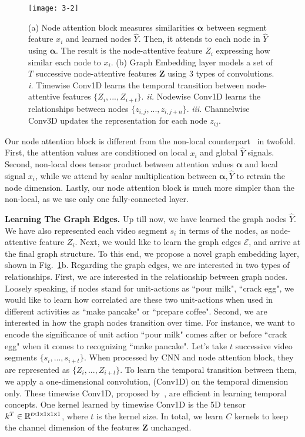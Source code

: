 \documentclass[10pt,twocolumn,letterpaper]{article}
\newcommand{\partitle}[1]{\noindent\textbf{#1}}
\newcommand{\ptspace}{\vspace*{5pt}}
\begin{document}
\begin{figure}[!ht]
\begin{center}
\texttt{[image: 3-2]}
\end{center}
\caption{(a) Node attention block measures similarities $\bm{\alpha}$ between segment feature $x_i$ and learned nodes $\hat{Y}$.
Then, it attends to each node in $\hat{Y}$ using $\bm{\alpha}$. The result is the node-attentive feature $Z_i$ expressing how similar each node to $x_i$.
(b) Graph Embedding layer models a set of $T$ successive node-attentive features $\mathbf{Z}$ using 3 types of convolutions.
\textit{i.} Timewise Conv1D learns the temporal transition between node-attentive features $\{Z_{i}, ..., Z_{i+t}\}$.
\textit{ii.} Nodewise Conv1D learns the relationships between nodes $\{ z_{i,j}, ..., z_{i,j+n} \}$.
\textit{iii.} Channelwise Conv3D updates the representation for each node $z_{ij}$.}
\label{fig:3-2}
\end{figure}

Our node attention block is different from the non-local counterpart~\cite{wang2017non} in twofold.
First, the attention values are conditioned on local $x_i$ and global $\hat{Y}$ signals.
Second, non-local does tensor product between attention values $\bm{\alpha}$ and local signal $x_i$, while we attend by scalar multiplication between $\bm{\alpha}, \hat{Y}$ to retrain the node dimension. Lastly, our node attention block is much more simpler than the non-local, as we use only one fully-connected layer.

\ptspace
\partitle{Learning The Graph Edges.}
Up till now, we have learned the graph nodes $\hat{Y}$.
We have also represented each video segment $s_i$ in terms of the nodes, as node-attentive feature $Z_i$.
Next, we would like to learn the graph edges $\mathcal{E}$, and arrive at the final graph structure.
To this end, we propose a novel graph embedding layer, shown in Fig.~\ref{fig:3-2}{\color{red}b}.
Regarding the graph edges, we are interested in two types of relationships.
First, we are interested in the relationship between graph nodes.
Loosely speaking, if nodes stand for unit-actions as ``pour milk", ``crack egg", we would like to learn how correlated are these two unit-actions when used in different activities as ``make pancake" or ``prepare coffee".
Second, we are interested in how the graph nodes transition over time.
For instance, we want to encode the significance of unit action ``pour milk" comes after or before ``crack egg" when it comes to recognizing ``make pancake".
Let's take $t$ successive video segments $\{ s_i, ..., s_{i+t} \}$.
When processed by CNN and node attention block, they are represented as $\{ Z_{i}, ..., Z_{i+t} \}$.
To learn the temporal transition between them, we apply a one-dimensional convolution, (Conv1D) on the temporal dimension only.
These timewise Conv1D, proposed by~\cite{hussein2018timeception}, are efficient in learning temporal concepts.
One kernel learned by timewise Conv1D is the 5D tensor $k^T \in \mathbb{R}^{t {\mkern-2mu\times\mkern-2mu} 1 {\mkern-2mu\times\mkern-2mu} 1 {\mkern-2mu\times\mkern-2mu} 1 {\mkern-2mu\times\mkern-2mu} 1}$, where $t$ is the kernel size.
In total, we learn $C$ kernels to keep the channel dimension of the features $\mathbf{Z}$ unchanged.
\end{document}
